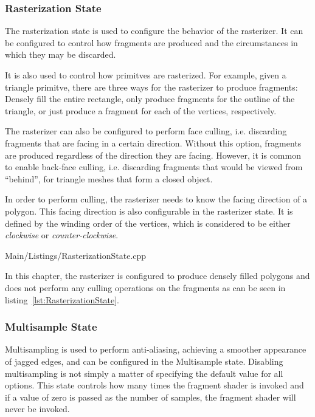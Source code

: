       \subsubsection{Rasterization State}
        The rasterization state is used to configure the behavior of the rasterizer.
        It can be configured to control how fragments are produced and the circumstances in which they may be discarded.

        It is also used to control how primitves are rasterized.
        For example, given a triangle primitve, there are three ways for the rasterizer to produce fragments: Densely fill the entire rectangle, only produce fragments for the outline of the triangle, or just produce a fragment for each of the vertices, respectively.

        The rasterizer can also be configured to perform face culling, i.e. discarding fragments that are facing in a certain direction.
        Without this option, fragments are produced regardless of the direction they are facing.
        However, it is common to enable back-face culling, i.e. discarding fragments that would be viewed from ``behind'', for triangle meshes that form a closed object.

        In order to perform culling, the rasterizer needs to know the facing direction of a polygon.
        This facing direction is also configurable in the rasterizer state.
        It is defined by the winding order of the vertices, which is considered to be either \textit{clockwise} or \textit{counter-clockwise}.

        
        {Main/Listings/RasterizationState.cpp}


        In this chapter, the rasterizer is configured to produce densely filled polygons and does not perform any culling operations on the fragments as can be seen in listing~\ref{lst:RasterizationState}.

      \subsubsection{Multisample State}
        Multisampling is used to perform anti-aliasing, achieving a smoother appearance of jagged edges, and can be configured in the Multisample state.
        Disabling multisampling is not simply a matter of specifying the default value for all options.
        This state controls how many times the fragment shader is invoked and if a value of zero is passed as the number of samples, the fragment shader will never be invoked.

